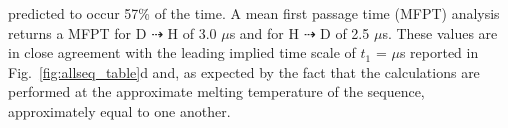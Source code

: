 \documentclass[journal=jpcbfk,manuscript=article]{achemso}
\newcommand*{\rood}[1]{{\color{red}{#1}}}
\newcommand*{\noteb}[1]{\textcolor{blue}{[[#1]]}}		%
\begin{document}
predicted to occur 57\% of the time. A mean first passage time (MFPT) analysis returns a MFPT for D $\dashrightarrow$ H of 3.0 $\mu$s and for H $\dashrightarrow$ D of 2.5 $\mu$s. These values are in close agreement with the leading implied time scale of $t_1$ = \rood{XX} $\mu$s reported in Fig.~\ref{fig:allseq_table}d and, as expected by the fact that the calculations are performed at the approximate melting temperature of the sequence, approximately equal to one another.  



\end{document}
